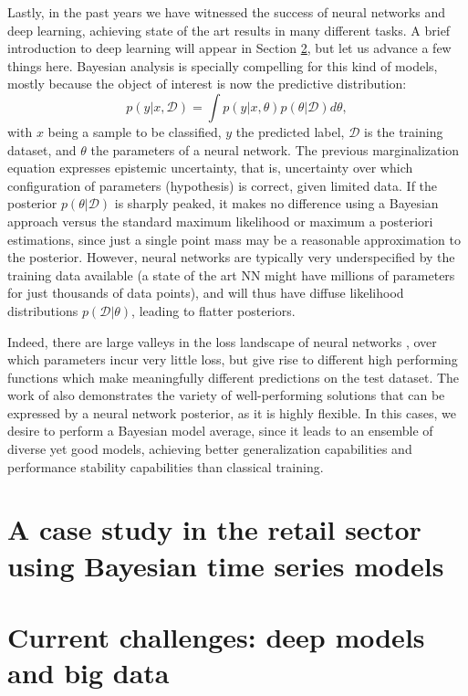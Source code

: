 Lastly, in the past years we have witnessed the success of neural networks and deep learning, achieving state of the art results in many different tasks. A brief introduction to deep learning will appear in Section \ref{sec:deep_intro}, but let us advance a few things here. Bayesian analysis is specially compelling for this kind of models, mostly because the object of interest  is now the predictive distribution:
$$
p(y|x, \mathcal{D}) = \int p(y|x,\theta) p (\theta| \mathcal{D}) d\theta,
$$
with $x$ being a sample to be classified, $y$ the predicted label, $\mathcal{D}$ is the training dataset, and $\theta$ the parameters of a neural network. The previous marginalization equation expresses epistemic uncertainty, that is, uncertainty over which configuration of parameters (hypothesis) is correct, given limited data. If the posterior $p(\theta| \mathcal{D})$ is sharply peaked, it makes no difference using a Bayesian approach versus the standard maximum likelihood or maximum a posteriori estimations, since just a single point mass may be a reasonable approximation to the posterior. However, neural networks are typically very underspecified by the training data available (a state of the art NN might have millions of parameters for just thousands of data points), and will thus have diffuse likelihood distributions $p(\mathcal{D}|\theta)$, leading to flatter posteriors.

Indeed, there are large valleys in the loss landscape of
neural networks \cite{garipov2018loss}, over which parameters incur very little loss, but give rise to different high performing
functions which make meaningfully different predictions on the test dataset. The work of \cite{ZOLNA2020102969}
also demonstrates the variety of well-performing solutions that can be expressed by a neural network
posterior, as it is highly flexible. In this cases, we desire to perform a Bayesian model average, since it leads to an ensemble of diverse yet good models, achieving better generalization capabilities and performance stability capabilities than classical training.


\section{A case study in the retail sector using Bayesian time series models}\label{sec:dlms}


\section{Current challenges: deep models and big data}\label{sec:deep_intro}


